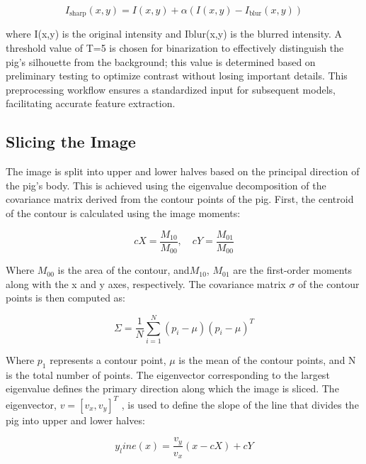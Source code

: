 {\begin{equation}
	I_{\text{sharp}}(x, y) = I(x, y) + \alpha (I(x, y) - I_{\text{blur}}(x, y))
\end{equation}

where I(x,y) is the original intensity and Iblur(x,y) is the blurred intensity. A threshold value of T=5 is chosen for binarization to effectively distinguish the pig’s silhouette from the background; this value is determined based on preliminary testing to optimize contrast without losing important details. This preprocessing workflow ensures a standardized input for subsequent models, facilitating accurate feature extraction.

\subsection{Slicing the Image}
The image is split into upper and lower halves based on the principal direction of the pig’s body. This is achieved using the eigenvalue decomposition of the covariance matrix derived from the contour points of the pig. First, the centroid of the contour is calculated using the image moments:

\begin{equation}
	cX = \frac{M_{10}}{M_{00}}, \quad cY = \frac{M_{01}}{M_{00}}
\end{equation}

Where $M_00$ is the area of the contour, and$M_10$, $M_01$ are the first-order moments along with the x and y axes, respectively.
The covariance matrix $\sigma$ of the contour points is then computed as:

\begin{equation}
	\Sigma = \frac{1}{N} \sum_{i=1}^{N} (p_i - \mu)(p_i - \mu)^T
\end{equation}

Where $p_1$ represents a contour point, $\mu$ is the mean of the contour points, and N is the total number of points. The eigenvector corresponding to the largest eigenvalue defines the primary direction along which the image is sliced. The eigenvector, $v=[v_x, v_y]^T$ , is used to define the slope of the line that divides the pig into upper and lower halves:

\begin{equation}
	y_line(x)=\frac{v_y}{v_x} (x-cX) + cY
\end{equation}

}
